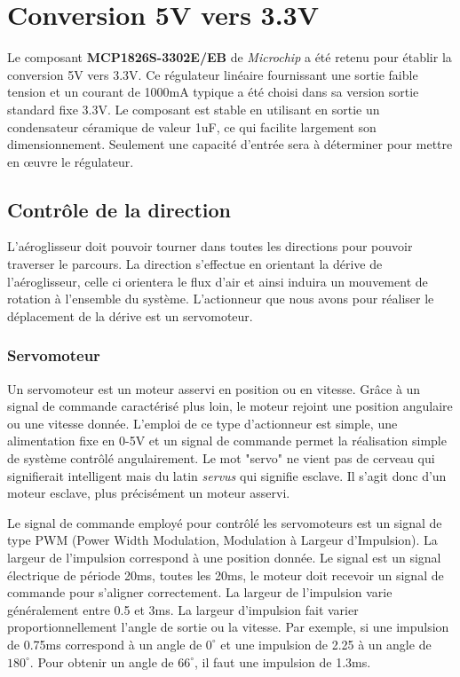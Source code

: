 \documentclass[a4paper,12pt]{report}
\begin{document}
				
				
				
				
			
		\section{Conversion 5V vers 3.3V}
			
		Le composant \textbf{MCP1826S-3302E/EB} de \textit{Microchip} a été retenu pour établir la conversion 5V vers 3.3V. Ce régulateur linéaire fournissant une sortie faible tension et un courant de 1000mA typique a été choisi dans sa version sortie standard fixe 3.3V. Le composant est stable en utilisant en sortie un condensateur céramique de valeur 1uF, ce qui facilite largement son dimensionnement. Seulement une capacité d'entrée sera à déterminer pour mettre en œuvre le régulateur.
	
		\subsection{Contrôle de la direction}
			L'aéroglisseur doit pouvoir tourner dans toutes les directions pour pouvoir traverser le parcours. La direction s'effectue en orientant la dérive de l'aéroglisseur, celle ci orientera le flux d'air et ainsi induira un mouvement de rotation à l'ensemble du système. L'actionneur que nous avons pour réaliser le déplacement de la dérive est un servomoteur.
			\subsubsection{Servomoteur}
			Un servomoteur est un moteur asservi en position ou en vitesse. Grâce à un signal de commande caractérisé plus loin, le moteur rejoint une position angulaire ou une vitesse donnée. L'emploi de ce type d'actionneur est simple, une alimentation fixe en 0-5V et un signal de commande permet la réalisation simple de système contrôlé angulairement. Le mot "servo" ne vient pas de cerveau qui signifierait intelligent mais du latin \textit{servus} qui signifie esclave. Il s'agit donc d'un moteur esclave, plus précisément un moteur asservi.
			
			Le signal de commande employé pour contrôlé les servomoteurs est un signal de type PWM (Power Width Modulation, Modulation à Largeur d'Impulsion). La largeur de l'impulsion correspond à une position donnée. Le signal est un signal électrique de période 20ms, toutes les 20ms, le moteur doit recevoir un signal de commande pour s'aligner correctement. La largeur de l'impulsion varie généralement entre 0.5 et 3ms. La largeur d'impulsion fait varier proportionnellement l'angle de sortie ou la vitesse. Par exemple, si une impulsion de 0.75ms correspond à un angle de $0^{\circ}$ et une impulsion de 2.25 à un angle de $180^{\circ}$. Pour obtenir un angle de $66^{\circ}$, il faut une impulsion de 1.3ms.   
\end{document}
